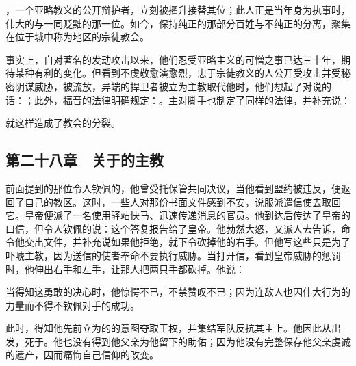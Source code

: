 ，一个亚略教义的公开辩护者，立刻被擢升接替其位；此人正是当年身为执事时，伟大的与一同贬黜的那一位。如今，保持纯正的那部分百姓与不纯正的分离，聚集在位于城中称为地区的宗徒教会。\par

事实上，自对著名的发动攻击以来，他们忍受亚略主义的可憎之事已达三十年，期待某种有利的变化。但看到不虔敬愈演愈烈，忠于宗徒教义的人公开受攻击并受秘密阴谋威胁，被流放，异端的捍卫者被立为主教取代他时，他们想起了对说的话：；此外，福音的法律明确规定：。主对脚手也制定了同样的法律，并补充说：\par

就这样造成了教会的分裂。\par


\subsection{第二十八章　关于的主教}

前面提到的那位令人钦佩的，他曾受托保管共同决议，当他看到盟约被违反，便返回了自己的教区。这时，一些人对那份书面文件感到不安，说服派遣信使去取回它。皇帝便派了一名使用驿站快马、迅速传递消息的官员。他到达后传达了皇帝的口信，但令人钦佩的说：这个答复报告给了皇帝。他勃然大怒，又派人去告诉，命令他交出文件，并补充说如果他拒绝，就下令砍掉他的右手。但他写这些只是为了吓唬主教，因为送信的使者奉命不要执行威胁。当打开信，看到皇帝威胁的惩罚时，他伸出右手和左手，让那人把两只手都砍掉。他说：\par

当得知这勇敢的决心时，他惊愕不已，不禁赞叹不已；因为连敌人也因伟大行为的力量而不得不钦佩对手的成功。\par

此时，得知他先前立为的的意图夺取王权，并集结军队反抗其主上。他因此从出发，死于。他也没有得到他父亲为他留下的助佑；因为他没有完整保存他父亲虔诚的遗产，因而痛悔自己信仰的改变。\par

